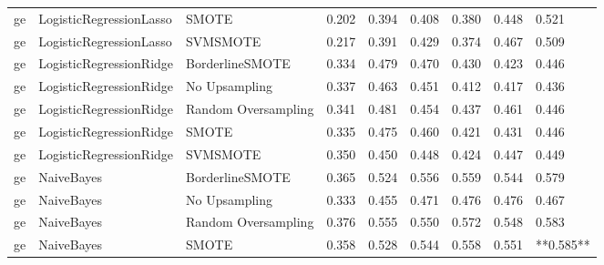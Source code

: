 \begin{tabular}{lllllllll}
      ge &      LogisticRegressionLasso &               SMOTE & 0.202 &                     0.394 &                 0.408 &                  0.380 &                                   0.448 &     0.521 \\
      ge &      LogisticRegressionLasso &            SVMSMOTE & 0.217 &                     0.391 &                 0.429 &                  0.374 &                                   0.467 &     0.509 \\
      ge &      LogisticRegressionRidge &     BorderlineSMOTE & 0.334 &                     0.479 &                 0.470 &                  0.430 &                                   0.423 &     0.446 \\
      ge &      LogisticRegressionRidge &       No Upsampling & 0.337 &                     0.463 &                 0.451 &                  0.412 &                                   0.417 &     0.436 \\
      ge &      LogisticRegressionRidge & Random Oversampling & 0.341 &                     0.481 &                 0.454 &                  0.437 &                                   0.461 &     0.446 \\
      ge &      LogisticRegressionRidge &               SMOTE & 0.335 &                     0.475 &                 0.460 &                  0.421 &                                   0.431 &     0.446 \\
      ge &      LogisticRegressionRidge &            SVMSMOTE & 0.350 &                     0.450 &                 0.448 &                  0.424 &                                   0.447 &     0.449 \\
      ge &                   NaiveBayes &     BorderlineSMOTE & 0.365 &                     0.524 &                 0.556 &                  0.559 &                                   0.544 &     0.579 \\
      ge &                   NaiveBayes &       No Upsampling & 0.333 &                     0.455 &                 0.471 &                  0.476 &                                   0.476 &     0.467 \\
      ge &                   NaiveBayes & Random Oversampling & 0.376 &                     0.555 &                 0.550 &                  0.572 &                                   0.548 &     0.583 \\
      ge &                   NaiveBayes &               SMOTE & 0.358 &                     0.528 &                 0.544 &                  0.558 &                                   0.551 & **0.585** \\

\end{tabular}
